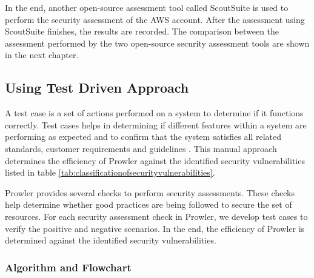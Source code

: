 \par In the end, another open-source assessment tool called ScoutSuite is used to perform the security assessment of the AWS account.
After the assessment using ScoutSuite finishes, the results are recorded.
The comparison between the assessment performed by the two open-source security
assessment tools are shown in the next chapter.

\subsection{Using Test Driven Approach}

\par A test case is a set of actions performed on a system to determine if it functions correctly. Test cases helps
in determining if different features within a system are performing as expected and to confirm that the system
satisfies all related standards, customer requirements and guidelines \cite{86}. This manual approach determines the
efficiency of Prowler against the identified security vulnerabilities listed in table \ref{tab:classificationofsecurityvulnerabilities}.

\par Prowler provides several checks to perform security assessments. These checks help determine whether good practices are being followed to secure the set of resources. For each security assessment check in Prowler, we develop test cases to verify the positive and negative scenarios. In the end, the efficiency of Prowler is determined against the identified security vulnerabilities.

\subsubsection{Algorithm and Flowchart}

